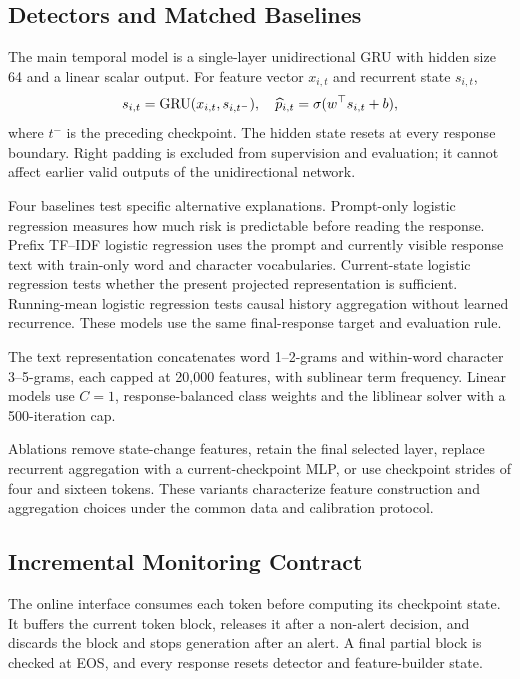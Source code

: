 \subsection{Detectors and Matched Baselines}
The main temporal model is a single-layer unidirectional GRU with hidden size 64 and a linear scalar output. For feature vector $x_{i,t}$ and recurrent state $s_{i,t}$,
\begin{equation*}
 s_{i,t}=\operatorname{GRU}(x_{i,t},s_{i,t^-}),\quad
 \widehat p_{i,t}=\sigma(w^\top s_{i,t}+b),
\end{equation*}
where $t^-$ is the preceding checkpoint. The hidden state resets at every response boundary. Right padding is excluded from supervision and evaluation; it cannot affect earlier valid outputs of the unidirectional network.

Four baselines test specific alternative explanations. Prompt-only logistic regression measures how much risk is predictable before reading the response. Prefix TF--IDF logistic regression uses the prompt and currently visible response text with train-only word and character vocabularies. Current-state logistic regression tests whether the present projected representation is sufficient. Running-mean logistic regression tests causal history aggregation without learned recurrence. These models use the same final-response target and evaluation rule.

The text representation concatenates word 1--2-grams and within-word character 3--5-grams, each capped at 20,000 features, with sublinear term frequency. Linear models use $C=1$, response-balanced class weights and the liblinear solver with a 500-iteration cap.

Ablations remove state-change features, retain the final selected layer, replace recurrent aggregation with a current-checkpoint MLP, or use checkpoint strides of four and sixteen tokens. These variants characterize feature construction and aggregation choices under the common data and calibration protocol.

\subsection{Incremental Monitoring Contract}
The online interface consumes each token before computing its checkpoint state. It buffers the current token block, releases it after a non-alert decision, and discards the block and stops generation after an alert. A final partial block is checked at EOS, and every response resets detector and feature-builder state.

